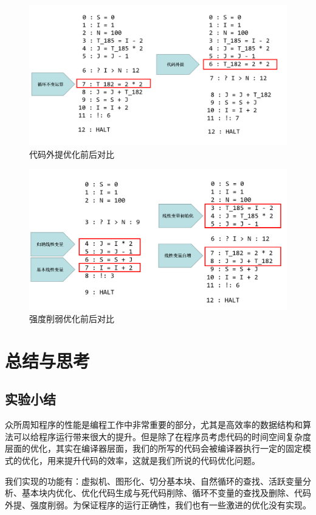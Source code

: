\documentclass[cn,black,11pt,normal]{elegantnote}
\begin{document}
\begin{figure}[H]
    \centering
    \includegraphics[width=0.8\linewidth]{image/res_loop.png}
    \caption{代码外提优化前后对比}
\end{figure}
\begin{figure}[H]
    \centering
    \includegraphics[width=0.8\linewidth]{image/res_for.png}
    \caption{强度削弱优化前后对比}
\end{figure}

\section{总结与思考}

\subsection{实验小结}

众所周知程序的性能是编程工作中非常重要的部分，尤其是高效率的数据结构和算法可以给程序运行带来很大的提升。但是除了在程序员考虑代码的时间空间复杂度层面的优化，其实在编译器层面，我们的所写的代码会被编译器执行一定的固定模式的优化，用来提升代码的效率，这就是我们所说的代码优化问题。

我们实现的功能有：虚拟机、图形化、切分基本块、自然循环的查找、活跃变量分析、基本块内优化、优化代码生成与死代码削除、循环不变量的查找及删除、代码外提、强度削弱。为保证程序的运行正确性，我们也有一些激进的优化没有实现。
\end{document}
